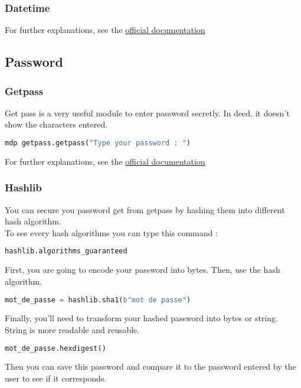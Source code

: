 \documentclass[a4paper, 12pt, titlepage]{scrartcl} %
\begin{document}
\subsubsection{Datetime}
For further explanations, see the \href{https://docs.python.org/3/library/datetime.html}{official documentation}

\subsection{Password}
\subsubsection{Getpass}
Get pass is a very useful module to enter password secretly. In deed, it doesn't show the characters entered.
\begin{lstlisting}[language=Python]
mdp getpass.getpass("Type your password : ")
\end{lstlisting} \vspace{5mm}

For further explanations, see the \href{https://docs.python.org/3/library/getpass.html}{official documentation}

\subsubsection{Hashlib}
You can secure you password get from getpass by hashing them into different hash algorithm.\\
To see every hash algorithms you can type this command : 
\begin{lstlisting}[language=Python]
hashlib.algorithms_guaranteed
\end{lstlisting} \vspace{5mm}
First, you are going to encode your password into bytes. Then, use the hash algorithm.
\begin{lstlisting}[language=Python]
mot_de_passe = hashlib.sha1(b"mot de passe")
\end{lstlisting} \vspace{5mm}
Finally, you'll need to transform your hashed password into bytes or string. String is more readable and reusable.
\begin{lstlisting}[language=Python]
mot_de_passe.hexdigest()
\end{lstlisting} \vspace{5mm}
Then you can save this password and compare it to the password entered by the user to see if it corresponds.
\end{document}

